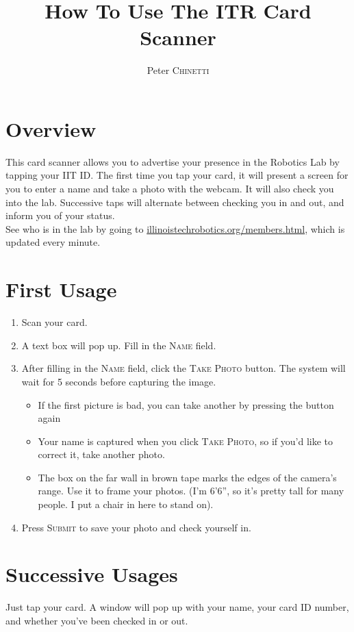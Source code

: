 \documentclass{article}
\title{How To Use The ITR Card Scanner}
\author{Peter \textsc{Chinetti}} %
\begin{document}
\maketitle %

\section{Overview}
This card scanner allows you to advertise your presence in the Robotics Lab by tapping your IIT ID. The first time you tap your card, it will present a screen for you to enter a name and take a photo with the webcam. It will also check you into the lab. Successive taps will alternate between checking you in and out, and inform you of your status.\\
See who is in the lab by going to \url{illinoistechrobotics.org/members.html}, which is updated every minute.

\section{First Usage}
\begin{enumerate}
\item Scan your card.
\item A text box will pop up. Fill in the \textsc{Name} field.
\item After filling in the \textsc{Name} field, click the \textsc{Take Photo} button. The system will wait for 5 seconds before capturing the image. 
  \begin{itemize}
  \item If the first picture is bad, you can take another by pressing the button again
  \item Your name is captured when you click \textsc{Take Photo}, so if you'd like to correct it, take another photo.
    \item The box on the far wall in brown tape marks the edges of the camera's range. Use it to frame your photos. (I'm 6'6'', so it's pretty tall for many people. I put a chair in here to stand on).
  \end{itemize}
  \item Press \textsc{Submit} to save your photo and check yourself in.
\end{enumerate}
\section{Successive Usages}
Just tap your card. A window will pop up with your name, your card ID number, and whether you've been checked in or out.
\end{document}
